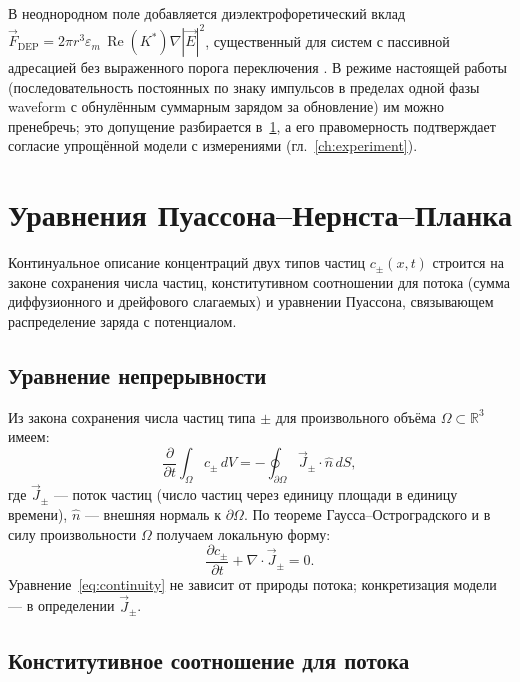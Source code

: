В неоднородном поле добавляется диэлектрофоретический вклад
$\vec{F}_{\mathrm{DEP}} = 2\pi r^3 \varepsilon_m\, \operatorname{Re}(K^*) \nabla|\vec{E}|^2$,
существенный для систем с пассивной адресацией без выраженного порога
переключения \cite{bert2003_physics}. В режиме настоящей работы
(последовательность постоянных по знаку импульсов в пределах одной фазы
waveform с обнулённым суммарным зарядом за обновление) им можно пренебречь;
это допущение разбирается в~\ref{sec:model-pde}, а его правомерность подтверждает
согласие упрощённой модели с измерениями (гл.~\ref{ch:experiment}).


\section{Уравнения Пуассона--Нернста--Планка}\label{sec:model-pde}

Континуальное описание концентраций двух типов частиц $c_\pm(x, t)$ строится
на законе сохранения числа частиц, конститутивном соотношении
для потока (сумма диффузионного и дрейфового слагаемых) и уравнении Пуассона,
связывающем распределение заряда с потенциалом.

\subsection*{Уравнение непрерывности}

Из закона сохранения числа частиц типа $\pm$ для произвольного объёма
$\Omega \subset \mathbb{R}^3$ имеем:
\begin{equation}\label{eq:continuity-integral}
    \frac{\partial}{\partial t} \int_{\Omega} c_\pm \, dV
    = -\oint_{\partial \Omega} \vec{J}_\pm \cdot \hat{n}\, dS,
\end{equation}
где $\vec{J}_\pm$ — поток частиц (число частиц через единицу площади в единицу
времени), $\hat{n}$ — внешняя нормаль к $\partial\Omega$. По теореме
Гаусса--Остроградского и в силу произвольности $\Omega$ получаем локальную
форму:
\begin{equation}\label{eq:continuity}
    \frac{\partial c_\pm}{\partial t} + \nabla \cdot \vec{J}_\pm = 0.
\end{equation}
Уравнение~\eqref{eq:continuity} не зависит от природы потока; конкретизация
модели — в определении $\vec{J}_\pm$.

\subsection*{Конститутивное соотношение для потока}


